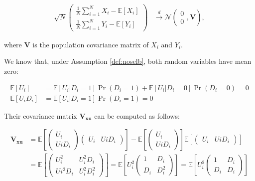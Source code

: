 \documentclass[]{book}
\newcommand{\esp}[1]{\mathbb{E}[ #1 ]}
\theoremstyle{definition}
\theoremstyle{definition}
\theoremstyle{definition}
\theoremstyle{remark}
\begin{document}
\begin{align*}
    \sqrt{N}
  \left(
      \begin{array}{c}  
       \frac{1}{N}\sum_{i=1}^NX_i-\esp{X_i}\\   
       \frac{1}{N}\sum_{i=1}^NY_i-\esp{Y_i}
       \end{array}
     \right) 
      &
  \stackrel{d}{\rightarrow}
  \mathcal{N}
  \left(
    \begin{array}{c}    
    0\\
    0
    \end{array},
  \mathbf{V}
  \right),
\end{align*}

where \(\mathbf{V}\) is the population covariance matrix of \(X_i\) and \(Y_i\).

We know that, under Assumption \ref{def:noselb}, both random variables have mean zero:

\begin{align*}
\esp{U_i}& = \esp{U_i|D_i=1}\Pr(D_i=1)+\esp{U_i|D_i=0}\Pr(D_i=0)=0 \\
\esp{U_iD_i}& = \esp{U_i|D_i=1}\Pr(D_i=1)=0
\end{align*}

Their covariance matrix \(\mathbf{V_{xu}}\) can be computed as follows:

\begin{align*}
\mathbf{V_{xu}} & = \esp{\left(\begin{array}{c}  U_i\\  UiD_i\end{array}\right)\left(\begin{array}{cc}  U_i&    UiD_i\end{array}\right)}
                  - \esp{\left(\begin{array}{c} U_i\\   UiD_i\end{array}\right)}\esp{\left(\begin{array}{cc}    U_i&    UiD_i\end{array}\right)}\\
                & = \esp{\left(\begin{array}{cc}    U_i^2 & U_i^2D_i\\  Ui^2D_i & U_i^2D_i^2\end{array}\right)} 
                  = \esp{U_i^2\left(\begin{array}{cc}   1 & D_i\\   D_i & D_i^2\end{array}\right)} 
                  = \esp{U_i^2\left(\begin{array}{cc}   1 & D_i\\   D_i & D_i\end{array}\right)} 
\end{align*}
\end{document}
